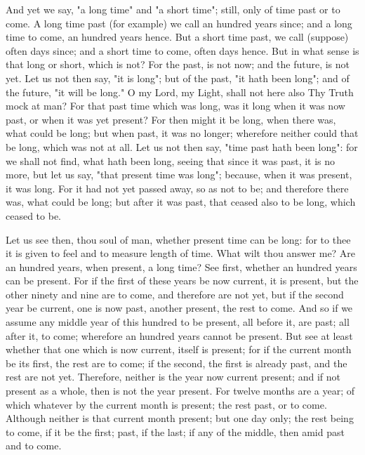 \documentclass[b5paper,openright,12pt,twoside]{book}
\begin{document}
And yet we say, "a long time" and "a short time"; still, only of time
past or to come. A long time past (for example) we call an hundred years
since; and a long time to come, an hundred years hence. But a short
time past, we call (suppose) often days since; and a short time to come,
often days hence. But in what sense is that long or short, which is not?
For the past, is not now; and the future, is not yet. Let us not then
say, "it is long"; but of the past, "it hath been long"; and of the
future, "it will be long." O my Lord, my Light, shall not here also Thy
Truth mock at man? For that past time which was long, was it long when
it was now past, or when it was yet present? For then might it be long,
when there was, what could be long; but when past, it was no longer;
wherefore neither could that be long, which was not at all. Let us not
then say, "time past hath been long": for we shall not find, what hath
been long, seeing that since it was past, it is no more, but let us say,
"that present time was long"; because, when it was present, it was long.
For it had not yet passed away, so as not to be; and therefore there
was, what could be long; but after it was past, that ceased also to be
long, which ceased to be.

Let us see then, thou soul of man, whether present time can be long:
for to thee it is given to feel and to measure length of time. What wilt
thou answer me? Are an hundred years, when present, a long time? See
first, whether an hundred years can be present. For if the first of
these years be now current, it is present, but the other ninety and
nine are to come, and therefore are not yet, but if the second year be
current, one is now past, another present, the rest to come. And so if
we assume any middle year of this hundred to be present, all before it,
are past; all after it, to come; wherefore an hundred years cannot be
present. But see at least whether that one which is now current, itself
is present; for if the current month be its first, the rest are to come;
if the second, the first is already past, and the rest are not yet.
Therefore, neither is the year now current present; and if not present
as a whole, then is not the year present. For twelve months are a year;
of which whatever by the current month is present; the rest past, or to
come. Although neither is that current month present; but one day only;
the rest being to come, if it be the first; past, if the last; if any of
the middle, then amid past and to come.
\end{document}
